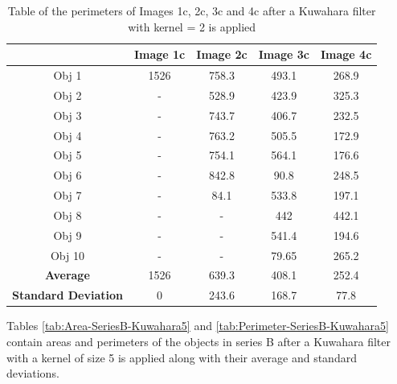 \documentclass[runningheads]{llncs}
\begin{document}
\begin{table}[h!]
\centering
\begin{tabular}{|c|c|c|c|c|}
\hline
\textbf{} & \textbf{Image 1c} & \textbf{Image 2c} & \textbf{Image 3c} & \textbf{Image 4c} \\
\hline
Obj 1 & 1526      & 758.3  & 493.1 &  268.9 \\ \hline
Obj 2 &  -          & 528.9  & 423.9 & 325.3\\ \hline
Obj 3 &   -         & 743.7 & 406.7 &  232.5\\ \hline
Obj 4 &   -         & 763.2 & 505.5 &  172.9 \\ \hline
Obj 5 &   -         & 754.1 & 564.1 &  176.6\\ \hline
Obj 6 &   -         & 842.8 & 90.8 &  248.5\\ \hline
Obj 7 &   -         & 84.1   & 533.8 & 197.1\\ \hline
Obj 8 &   -         &  -     & 442 &  442.1 \\ \hline
Obj 9 &    -        &  -     &  541.4    & 194.6\\ \hline
Obj 10 &  -          &  -     &  79.65    & 265.2\\ \hline
\textbf{Average} &   1526  &  639.3   &   408.1   & 252.4  \\ \hline
\textbf{Standard Deviation} &  0      &  243.6    &    168.7 & 77.8 \\ \hline
\end{tabular}
\caption{Table of the perimeters of Images 1c, 2c, 3c and 4c after a Kuwahara filter with kernel = 2 is applied}
\label{tab:Perimeter-SeriesC-Kuwahara2}
\end{table}

\newpage
Tables \ref{tab:Area-SeriesB-Kuwahara5} and \ref{tab:Perimeter-SeriesB-Kuwahara5} contain areas and perimeters of the objects in series B after a Kuwahara filter with a kernel of size 5 is applied along with their average and standard deviations.
\end{document}
